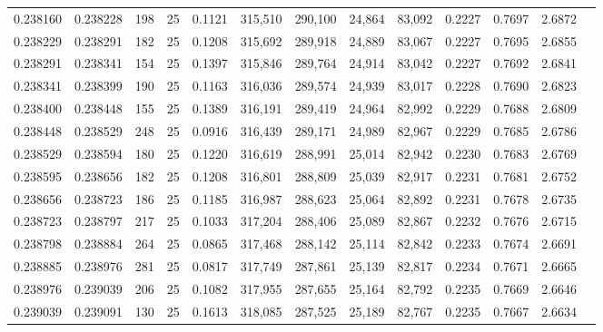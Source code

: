 \begin{tabular}{rrrrrrrrrrrrr}
0.238160 & 0.238228 &   198 &  25 &                                     0.1121 & 315,510 & 290,100 &  24,864 &  83,092 & 0.2227 & 0.7697 & 2.6872 \\
0.238229 & 0.238291 &   182 &  25 &                                     0.1208 & 315,692 & 289,918 &  24,889 &  83,067 & 0.2227 & 0.7695 & 2.6855 \\
0.238291 & 0.238341 &   154 &  25 &                                     0.1397 & 315,846 & 289,764 &  24,914 &  83,042 & 0.2227 & 0.7692 & 2.6841 \\
0.238341 & 0.238399 &   190 &  25 &                                     0.1163 & 316,036 & 289,574 &  24,939 &  83,017 & 0.2228 & 0.7690 & 2.6823 \\
0.238400 & 0.238448 &   155 &  25 &                                     0.1389 & 316,191 & 289,419 &  24,964 &  82,992 & 0.2229 & 0.7688 & 2.6809 \\
0.238448 & 0.238529 &   248 &  25 &                                     0.0916 & 316,439 & 289,171 &  24,989 &  82,967 & 0.2229 & 0.7685 & 2.6786 \\
0.238529 & 0.238594 &   180 &  25 &                                     0.1220 & 316,619 & 288,991 &  25,014 &  82,942 & 0.2230 & 0.7683 & 2.6769 \\
0.238595 & 0.238656 &   182 &  25 &                                     0.1208 & 316,801 & 288,809 &  25,039 &  82,917 & 0.2231 & 0.7681 & 2.6752 \\
0.238656 & 0.238723 &   186 &  25 &                                     0.1185 & 316,987 & 288,623 &  25,064 &  82,892 & 0.2231 & 0.7678 & 2.6735 \\
0.238723 & 0.238797 &   217 &  25 &                                     0.1033 & 317,204 & 288,406 &  25,089 &  82,867 & 0.2232 & 0.7676 & 2.6715 \\
0.238798 & 0.238884 &   264 &  25 &                                     0.0865 & 317,468 & 288,142 &  25,114 &  82,842 & 0.2233 & 0.7674 & 2.6691 \\
0.238885 & 0.238976 &   281 &  25 &                                     0.0817 & 317,749 & 287,861 &  25,139 &  82,817 & 0.2234 & 0.7671 & 2.6665 \\
0.238976 & 0.239039 &   206 &  25 &                                     0.1082 & 317,955 & 287,655 &  25,164 &  82,792 & 0.2235 & 0.7669 & 2.6646 \\
0.239039 & 0.239091 &   130 &  25 &                                     0.1613 & 318,085 & 287,525 &  25,189 &  82,767 & 0.2235 & 0.7667 & 2.6634 \\

\end{tabular}
